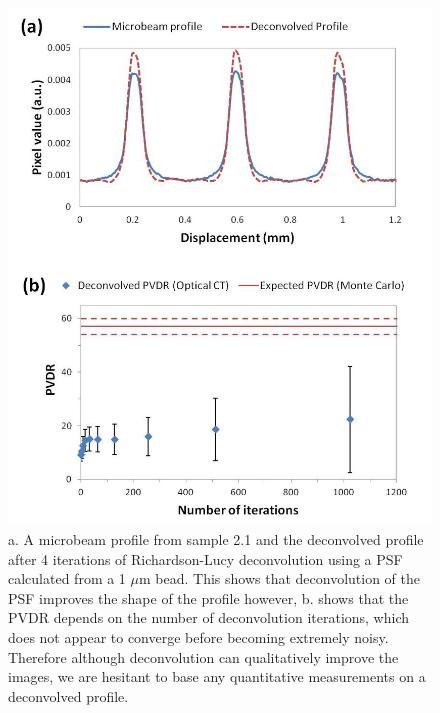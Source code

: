	\begin{figure}
		\centering
		\includegraphics[width=0.85\linewidth]{mrt_img/mrt_Fig8}
		\caption{a. A microbeam profile from sample 2.1 and the deconvolved profile after 4 iterations of Richardson-Lucy deconvolution using a PSF calculated from a 1 $\mu$m bead. This shows that deconvolution of the PSF improves the shape of the profile however, b. shows that the PVDR depends on the number of deconvolution iterations, which does not appear to converge before becoming extremely noisy. Therefore although deconvolution can qualitatively improve the images, we are hesitant to base any quantitative measurements on a deconvolved profile.}
		\label{fig:Fig8}
	\end{figure}
	
	
